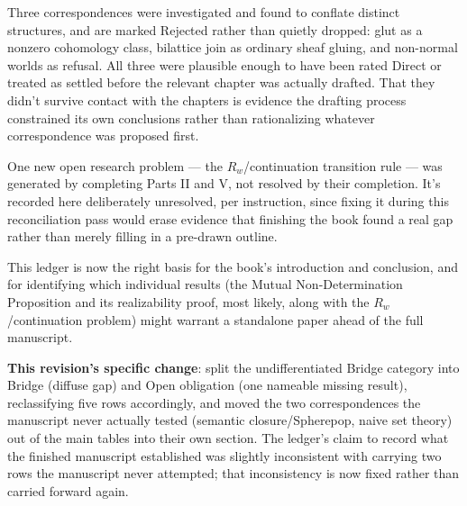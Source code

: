 Three correspondences were investigated and found to conflate distinct
structures, and are marked Rejected rather than quietly dropped: glut as
a nonzero cohomology class, bilattice join as ordinary sheaf gluing, and
non-normal worlds as refusal. All three were plausible enough to have
been rated Direct or treated as settled before the relevant chapter was
actually drafted. That they didn't survive contact with the chapters is
evidence the drafting process constrained its own conclusions rather than
rationalizing whatever correspondence was proposed first.

One new open research problem --- the \(R_w\)/continuation transition rule ---
was generated by completing Parts II and V, not resolved by their
completion. It's recorded here deliberately unresolved, per instruction,
since fixing it during this reconciliation pass would erase evidence that
finishing the book found a real gap rather than merely filling in a
pre-drawn outline.

This ledger is now the right basis for the book's introduction and
conclusion, and for identifying which individual results (the Mutual
Non-Determination Proposition and its realizability proof, most likely,
along with the \(R_w\)/continuation problem) might warrant a standalone
paper ahead of the full manuscript.

\textbf{This revision's specific change}: split the undifferentiated Bridge
category into Bridge (diffuse gap) and Open obligation (one nameable
missing result), reclassifying five rows accordingly, and moved the two
correspondences the manuscript never actually tested (semantic
closure/Spherepop, naive set theory) out of the main tables into their
own section. The ledger's claim to record what the finished manuscript
established was slightly inconsistent with carrying two rows the
manuscript never attempted; that inconsistency is now fixed rather than
carried forward again.
